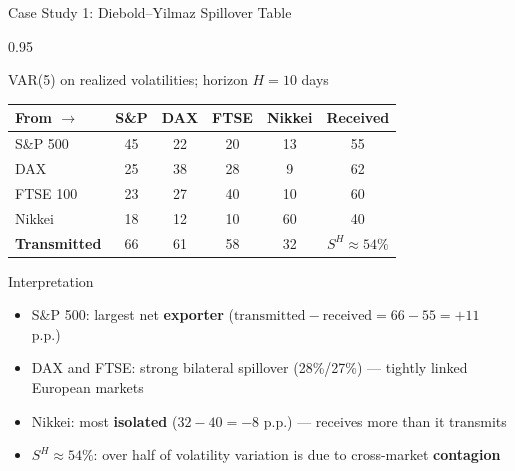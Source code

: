\documentclass[9pt, aspectratio=169, t]{beamer}
\begin{document}
\begin{frame}{Case Study 1: Diebold--Yilmaz Spillover Table}
    \begin{cminipage}{0.95\textwidth}
    \vspace{-2mm}
    {\footnotesize
    \begin{block}{VAR(5) on realized volatilities; horizon $H = 10$ days}
        \vspace{0.1cm}
        {\small
        \begin{center}
        \begin{tabular}{l|cccc|c}
            \hline
            \textbf{From $\rightarrow$} & S\&P & DAX & FTSE & Nikkei & \textbf{Received} \\
            \hline
            S\&P 500  & 45 & 22 & 20 & 13 & 55 \\
            DAX       & 25 & 38 & 28 &  9 & 62 \\
            FTSE 100  & 23 & 27 & 40 & 10 & 60 \\
            Nikkei    & 18 & 12 & 10 & 60 & 40 \\
            \hline
            \textbf{Transmitted} & 66 & 61 & 58 & 32 & $S^H \approx 54\%$ \\
            \hline
        \end{tabular}
        \end{center}
        }
    \end{block}
    \begin{alertblock}{Interpretation}
        \begin{itemize}\setlength{\itemsep}{0pt}
            \item S\&P 500: largest net \textbf{exporter} ($\text{transmitted} - \text{received} = 66 - 55 = +11$ p.p.)
            \item DAX and FTSE: strong bilateral spillover (28\%/27\%) --- tightly linked European markets
            \item Nikkei: most \textbf{isolated} ($32 - 40 = -8$ p.p.) --- receives more than it transmits
            \item $S^H \approx 54\%$: over half of volatility variation is due to cross-market \textbf{contagion}
        \end{itemize}
    \end{alertblock}
    }
    \end{cminipage}
    \hfill{}
\end{frame}
\end{document}
